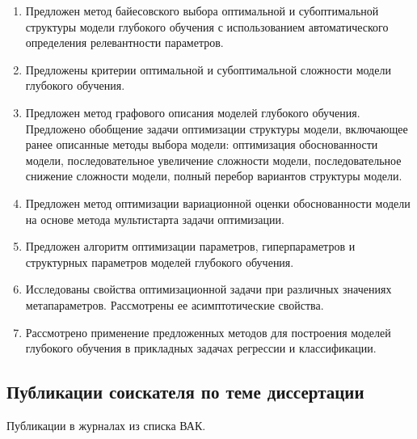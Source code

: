 \documentclass[11pt, a5paper]{dissert}
\theoremstyle{definition}
\begin{document}
{\begin{enumerate}
\item Предложен метод байесовского выбора оптимальной и субоптимальной структуры модели глубокого обучения с использованием автоматического определения релевантности параметров.
\item Предложены критерии оптимальной и субоптимальной сложности модели глубокого обучения.
\item Предложен метод графового описания моделей глубокого обучения.
Предложено обобщение задачи оптимизации структуры модели, включающее ранее описанные методы выбора модели: оптимизация обоснованности модели, последовательное увеличение сложности модели, последовательное снижение сложности модели, полный перебор вариантов структуры модели.
\item Предложен метод оптимизации вариационной оценки обоснованности модели на основе метода мультистарта задачи оптимизации.
\item Предложен алгоритм оптимизации параметров, гиперпараметров и структурных параметров моделей глубокого обучения.
\item Исследованы свойства оптимизационной задачи при различных значениях метапараметров. Рассмотрены ее асимптотические свойства.
\item Рассмотрено применение предложенных  методов для построения моделей глубокого обучения в прикладных задачах регрессии и классификации.
\end{enumerate}

\subsection*{Публикации соискателя по теме диссертации}
Публикации в журналах из списка ВАК.
\vspace{0.3cm}

}
\end{document}
